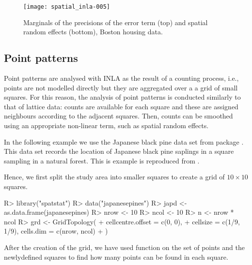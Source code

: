 \documentclass[article]{jss}
\begin{document}
\begin{figure}[h]
\begin{center}
\texttt{[image: spatial\_inla-005]}
\end{center}
\caption{Marginals of the precisions of the error term (top) and
spatial random effects (bottom), Boston housing data.}
\label{fig:marg1}
\end{figure}


\subsection{Point patterns}

Point patterns are analysed with INLA as the result of a counting process,
i.e., points are not modelled directly but they are aggregated over a a grid
of small squares. For this reason, the analysis of point patterns is conducted
similarly to that of lattice data: counts are available for each square and 
these are assigned neighbours according to the adjacent squares. Then, counts
can be smoothed using an appropriate non-linear term, such as spatial
random effects.

In the following example we use the Japanese black pine data set from
 package  \citep{spatstat:2005}. This data set records the location of
Japanese black pine saplings in a square sampling in a natural forest.  This
is example is reproduced from \citet{GomezRubioetal:2013}.

Hence, we first split the study area into smaller squares to create a
grid of $10\times 10$ squares.

\begin{Schunk}
\begin{Sinput}
R> library("spatstat")
R> data("japanesepines")
R> japd <- as.data.frame(japanesepines)
R> nrow <- 10
R> ncol <- 10
R> n <- nrow * ncol
R> grd <- GridTopology(
+     cellcentre.offset = c(0, 0),
+     cellsize = c(1/9, 1/9), cells.dim = c(nrow, ncol)
+  )
\end{Sinput}
\end{Schunk}


After the creation of the grid, we have used function  on
the set of points and the newlydefined squares to find how many points can be
found in each square.

\begin{Schunk}
\end{Schunk}
\end{document}
